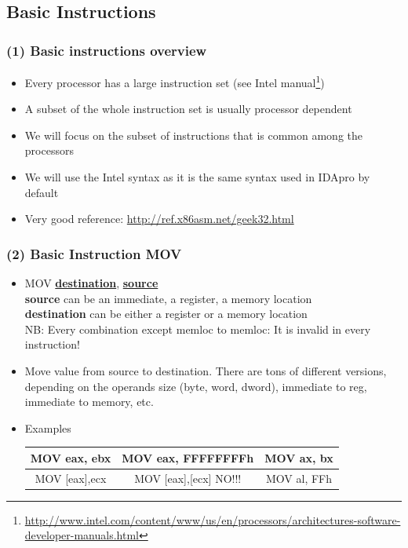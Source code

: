 \documentclass[]{beamer}
\begin{document}
\subsection{Basic Instructions}
\begin{frame}
  \frametitle{(1) Basic instructions overview}
  \begin{itemize}
  \item{Every processor has a large instruction set (see Intel manual\footnote{\url{http://www.intel.com/content/www/us/en/processors/architectures-software-developer-manuals.html}})}
  \item{A subset of the whole instruction set is usually processor dependent}
  \item{We will focus on the subset of instructions that is common among the processors}
  \item{We will use the Intel syntax as it is the same syntax used in IDApro by default}
  \item Very good reference: \url{http://ref.x86asm.net/geek32.html}
  \end{itemize}
\end{frame}
\begin{frame}
  \frametitle{(2) Basic Instruction MOV}
  \begin{itemize}
  \item{MOV \underline{\textbf{destination}}, \underline{\textbf{source}}}\\
    \textbf{source} can be an immediate, a register, a memory location\\
    \textbf{destination} can be either a register  or a memory location\\

    NB: Every combination except memloc to memloc: It is invalid in
    every instruction!

  \item{Move value from source to destination. There are tons of
      different versions, depending on the operands size (byte, word,
      dword), immediate to reg, immediate to memory, etc. }
  \item{Examples}
    \begin{table}[h]
      \begin{tabular}{|c|c|c|}
        \hline
        MOV eax, ebx&MOV eax, FFFFFFFFh &MOV ax, bx\\    \hline
        MOV [eax],ecx&MOV [eax],[ecx] \color{red}NO!!!&MOV al, FFh\\
        \hline
      \end{tabular}
    \end{table}
  \end{itemize}

\end{frame}
\end{document}
